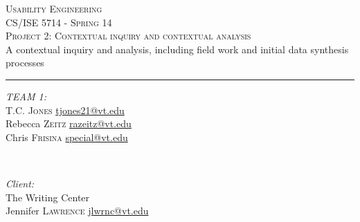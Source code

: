 \documentclass[12pt]{article} %
\newcommand{\HRule}{\rule{\linewidth}{0.5mm}} %
\begin{document}
\begin{titlepage}

  \center %

  \textsc{\LARGE Usability Engineering}\\[1.5mm] 
  \textsc{\Large CS/ISE 5714 - Spring 14}\\[1mm] 
  \textsc{Project 2: Contextual inquiry and contextual analysis}\\[1mm] 

  { \small A contextual inquiry and analysis, including field work and initial data synthesis processes }\\
  \HRule
  \vspace{4mm}

  \begin{minipage}{0.4\textwidth}
  \begin{flushleft} \small
  \emph{TEAM 1:}\\
  T.C. \textsc{Jones} \href{mailto:tjones21@vt.edu}{tjones21@vt.edu}\\
  Rebecca \textsc{Zeitz} \href{mailto:razeitz@vt.edu}{razeitz@vt.edu}\\
  Chris \textsc{Frisina}  \href{mailto:special@vt.edu}{special@vt.edu}\\
  \end{flushleft}
  \end{minipage}
  ~
  \begin{minipage}{0.4\textwidth}
  \begin{flushright} \small
  \emph{Client:} \\
  The Writing Center\\
  Jennifer \textsc{Lawrence}  \href{mailto:jlwrnc@vt.edu}{jlwrnc@vt.edu}
  \end{flushright}
  \end{minipage}\\
  [5mm]
  
  \begingroup
  \def\addvspace#1{}
    \tableofcontents\hypertarget{toc}{}
  \endgroup
\end{titlepage}
\end{document}
